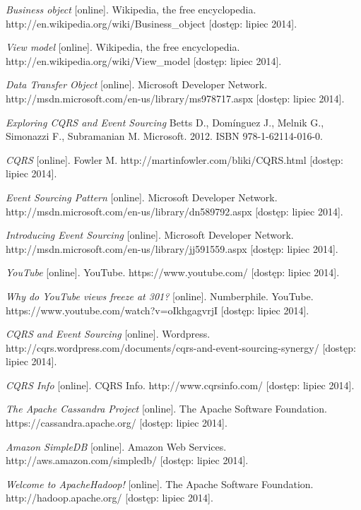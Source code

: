 \begin{thebibliography}{}
  \emph{Business object} [online].
  Wikipedia, the free encyclopedia.
  http://en.wikipedia.org/wiki/Business\_object [dostęp: lipiec 2014].
  
  \emph{View model} [online].
  Wikipedia, the free encyclopedia.
  http://en.wikipedia.org/wiki/View\_model [dostęp: lipiec 2014].
 
  \emph{Data Transfer Object} [online].
  Microsoft Developer Network.
  http://msdn.microsoft.com/en-us/library/ms978717.aspx [dostęp: lipiec 2014].
 
  \emph{Exploring CQRS and Event Sourcing}
  Betts D., Domínguez J., Melnik G., Simonazzi F., Subramanian M.
  Microsoft.
  2012.
  ISBN 978-1-62114-016-0.
 
  \emph{CQRS} [online].
  Fowler M.
  http://martinfowler.com/bliki/CQRS.html [dostęp: lipiec 2014].
 
  \emph{Event Sourcing Pattern} [online].
  Microsoft Developer Network.
  http://msdn.microsoft.com/en-us/library/dn589792.aspx [dostęp: lipiec 2014].
 
  \emph{Introducing Event Sourcing} [online].
  Microsoft Developer Network.
  http://msdn.microsoft.com/en-us/library/jj591559.aspx [dostęp: lipiec 2014].
 
  \emph{YouTube} [online].
  YouTube.
  https://www.youtube.com/ [dostęp: lipiec 2014].
 
  \emph{Why do YouTube views freeze at 301?} [online].
  Numberphile.
  YouTube.
  https://www.youtube.com/watch?v=oIkhgagvrjI [dostęp: lipiec 2014].
 
  \emph{CQRS and Event Sourcing} [online].
  Wordpress.
  http://cqrs.wordpress.com/documents/cqrs-and-event-sourcing-synergy/ [dostęp: lipiec 2014].
  
  \emph{CQRS Info} [online].
  CQRS Info.
  http://www.cqrsinfo.com/ [dostęp: lipiec 2014].
 
  \emph{The Apache Cassandra Project} [online].
  The Apache Software Foundation.
  https://cassandra.apache.org/ [dostęp: lipiec 2014].
 
  \emph{Amazon SimpleDB} [online].
  Amazon Web Services.
  http://aws.amazon.com/simpledb/ [dostęp: lipiec 2014].
  
  \emph{Welcome to Apache\texttrademark Hadoop\textregistered!} [online].
  The Apache Software Foundation.
  http://hadoop.apache.org/ [dostęp: lipiec 2014].
 

\end{thebibliography}
